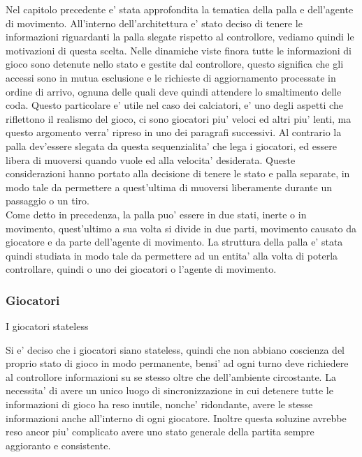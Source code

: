 Nel capitolo precedente e’ stata approfondita la tematica della palla e dell’agente di movimento. All’interno dell’architettura e’ stato deciso di tenere le informazioni riguardanti la palla slegate rispetto al controllore, vediamo quindi le motivazioni di questa scelta. Nelle dinamiche viste finora tutte le informazioni di gioco sono detenute nello stato e gestite dal controllore, questo significa che gli accessi sono in mutua esclusione e le richieste di aggiornamento processate in ordine di arrivo, ognuna delle quali deve quindi attendere lo smaltimento delle coda. Questo particolare e’ utile nel caso dei calciatori, e’ uno degli aspetti che riflettono il realismo del gioco, ci sono giocatori piu’ veloci ed altri piu’ lenti, ma questo argomento verra’ ripreso in uno dei paragrafi successivi. Al contrario la palla dev’essere slegata da questa sequenzialita’ che lega i giocatori, ed essere libera di muoversi quando vuole ed alla velocita’ desiderata. Queste considerazioni hanno portato alla decisione di tenere le stato e palla separate, in modo tale da permettere a quest’ultima di muoversi liberamente durante un passaggio o un tiro.\\

Come detto in precedenza, la palla puo’ essere in due stati, inerte o in movimento, quest’ultimo a sua volta si divide in due parti, movimento causato da giocatore e da parte dell’agente di movimento. La struttura della palla e’ stata quindi studiata in modo tale da permettere ad un entita’ alla volta di poterla controllare, quindi o uno dei giocatori o l’agente di movimento.

\subsubsection*{Giocatori}
%
\label{sec:analisi_concorrenza_giocatori}

I giocatori stateless

Si e’ deciso che i giocatori siano stateless, quindi che non abbiano coscienza del proprio stato di gioco in modo permanente, bensi’ ad ogni turno deve richiedere al controllore informazioni su se stesso oltre che dell’ambiente circostante. La necessita’ di avere un unico luogo di sincronizzazione in cui detenere tutte le informazioni di gioco ha reso inutile, nonche’ ridondante, avere le stesse informazioni anche all’interno di ogni giocatore. Inoltre questa soluzine avrebbe reso ancor piu’ complicato avere uno stato generale della partita sempre aggioranto e consistente.\\

